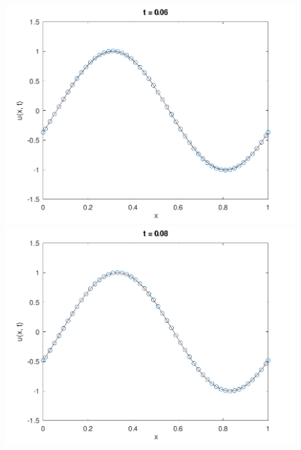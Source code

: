 \documentclass[
	8pt,
	professionalfonts,
	leqno,
	intlimits,
	c,
    aspectratio=1610,
]{beamer}
\begin{document}
\begin{frame}
\begin{figure}[H]
        \includegraphics[width=.4\paperwidth]{../examples/octave/hyperbolic1D3.pdf}
        \includegraphics[width=.4\paperwidth]{../examples/octave/hyperbolic1D4.pdf}
    \end{figure}
\end{frame}
\end{document}
